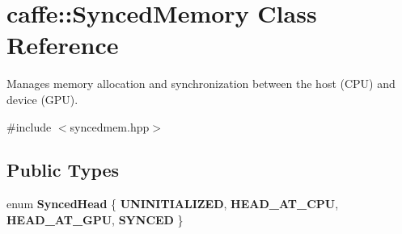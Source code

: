 \hypertarget{classcaffe_1_1SyncedMemory}{}\section{caffe\+:\+:Synced\+Memory Class Reference}
\label{classcaffe_1_1SyncedMemory}


Manages memory allocation and synchronization between the host (C\+PU) and device (G\+PU).  




{\ttfamily \#include $<$syncedmem.\+hpp$>$}

\subsection*{Public Types}
\begin{DoxyCompactItemize}
\item 
enum {\bfseries Synced\+Head} \{ {\bfseries U\+N\+I\+N\+I\+T\+I\+A\+L\+I\+Z\+ED}, 
{\bfseries H\+E\+A\+D\+\_\+\+A\+T\+\_\+\+C\+PU}, 
{\bfseries H\+E\+A\+D\+\_\+\+A\+T\+\_\+\+G\+PU}, 
{\bfseries S\+Y\+N\+C\+ED}
 \}\hypertarget{classcaffe_1_1SyncedMemory_aa9d505f04322f6e521a57b8fc51dfba1}{}\label{classcaffe_1_1SyncedMemory_aa9d505f04322f6e521a57b8fc51dfba1}

\end{DoxyCompactItemize}

